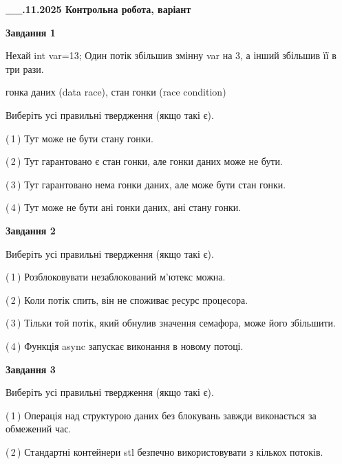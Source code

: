 \documentclass[12pt, ukrainian]{article}
\begin{document}
\begin {large}

\textbf{\_\_.11.2025 Контрольна робота, варіант  }\par


{

\begin{center}
\textbf{Завдання 1}
\end{center}
Нехай int var=13; Один потік збільшив змінну var на 3, а інший збільшив її в три рази.

гонка даних (data race), стан гонки (race condition)

Виберіть усі правильні твердження (якщо такі є).\par
\vspace{2mm}
(\,1\,) Тут може не бути стану гонки.%

(\,2\,) Тут гарантовано є стан гонки, але гонки даних може не бути.%

(\,3\,) Тут гарантовано нема гонки даних, але може бути стан гонки.%

(\,4\,) Тут може не бути ані гонки даних, ані стану гонки.%



\begin{center}
\textbf{Завдання 2}
\end{center}
Виберіть усі правильні твердження (якщо такі є).\par
\vspace{2mm}

(\,1\,) Розблоковувати незаблокований м’ютекс можна.%

(\,2\,) Коли потік спить, він не споживає ресурс процесора.%

(\,3\,) Тільки той потік, який обнулив значення семафора, може його збільшити.%

(\,4\,) Функція async запускає виконання в новому потоці.%



\begin{center}
\textbf{Завдання 3}
\end{center}
Виберіть усі правильні твердження (якщо такі є).\par
\vspace{2mm}

(\,1\,) Операція над структурою даних без блокувань завжди виконається за обмежений час.%

(\,2\,) Стандартні контейнери stl безпечно використовувати з кількох потоків.%

}
\end{large}
\end{document}
